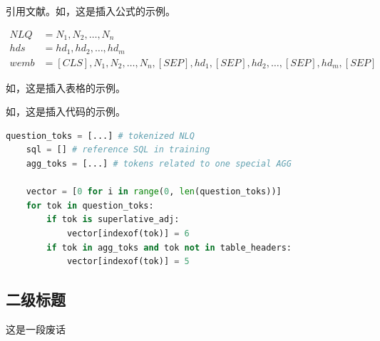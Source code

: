 引用文献\cite{zhongSeq2SQL2017}。如，这是插入公式的示例。

\begin{equation}\label{eq:bert-wemb}
	\begin{aligned}
		NLQ&=N_1, N_2, \dots, N_n \\
		hds&=hd_1, hd_2, \dots, hd_m \\
		wemb&=[CLS], N_1, N_2, \dots, N_n, [SEP], hd_1, [SEP], hd_2, \dots, [SEP], hd_m, [SEP]
	\end{aligned}
\end{equation}

如，这是插入表格的示例。

\begin{table}[htbp]
	\centering
	\caption{WikiSQL数据表示例}
	\label{tab:WikiSQL}
\end{table}

如，这是插入代码的示例。

\begin{lstlisting}[language=python, caption={ASCTEP的AGG感知向量构造过程}, label={code:code-example}]
	question_toks = [...] # tokenized NLQ
	sql = [] # reference SQL in training
	agg_toks = [...] # tokens related to one special AGG
	
	vector = [0 for i in range(0, len(question_toks))]
	for tok in question_toks:
		if tok is superlative_adj:
			vector[indexof(tok)] = 6
		if tok in agg_toks and tok not in table_headers:
			vector[indexof(tok)] = 5
	\end{lstlisting}

\subsection{二级标题}

这是一段废话